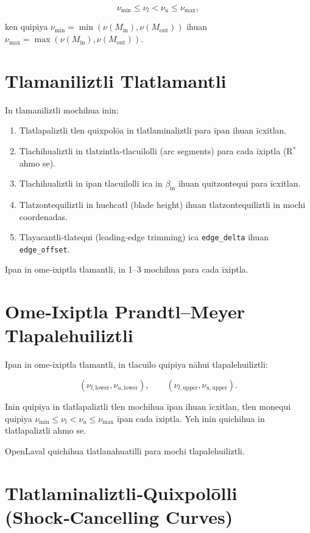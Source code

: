 \[
\nu_{\min} \le \nu_l < \nu_u \le \nu_{\max},
\]



ken quipiya $\nu_{\min} = \min(\nu(M_{\mathrm{in}}), \nu(M_{\mathrm{out}}))$ ihuan 
$\nu_{\max} = \max(\nu(M_{\mathrm{in}}), \nu(M_{\mathrm{out}}))$.

\section{Tlamaniliztli Tlatlamantli}

In tlamaniliztli mochihua inin:

\begin{enumerate}
  \item Tlatlapaliztli tlen quixpolōa in tlatlaminaliztli
        para īpan ihuan īcxitlan.
  \item Tlachihualiztli in tlatzintla‑tlacuilolli (arc segments)
        para cada īxiptla (R$^\ast$ ahmo se).
  \item Tlachihualiztli in īpan tlacuilolli ica in
        $\beta_{\mathrm{in}}$ ihuan quitzontequi para īcxitlan.
  \item Tlatzontequiliztli in huehcatl (blade height)
        ihuan tlatzontequiliztli in mochi coordenadas.
  \item Tlayacantli‑tlatequi (leading‑edge trimming)
        ica \texttt{edge\_delta} ihuan \texttt{edge\_offset}.
\end{enumerate}

Ipan in ome‑ixiptla tlamantli, in 1–3 mochihua
para cada īxiptla.

\section{Ome‑Ixiptla Prandtl–Meyer Tlapalehuiliztli}

Ipan in ome‑ixiptla tlamantli, in tlacuilo quipiya
nāhui tlapalehuiliztli:



\[
(\nu_{l,\mathrm{lower}}, \nu_{u,\mathrm{lower}}), \qquad
(\nu_{l,\mathrm{upper}}, \nu_{u,\mathrm{upper}}).
\]



Inin quipiya in tlatlapaliztli tlen mochihua īpan
ihuan īcxitlan, tlen monequi quipiya $\nu_{\min} \le \nu_l < \nu_u \le \nu_{\max}$ īpan cada īxiptla.
Yeh inin quichihua in tlatlapaliztli ahmo se.

OpenLaval quichihua tlatlanahuatilli para mochi
tlapalehuiliztli.

\section{Tlatlaminaliztli‑Quixpolōlli (Shock‑Cancelling Curves)}

